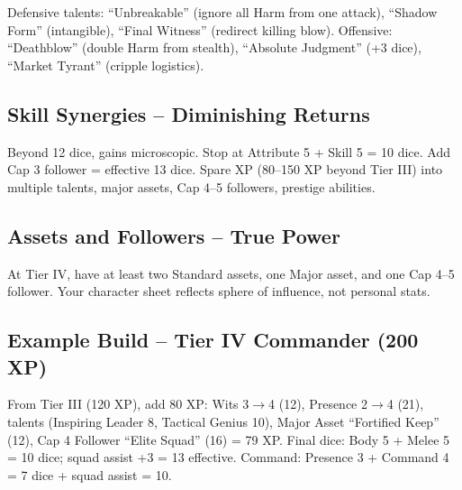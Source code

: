 \documentclass[11pt]{article}
\begin{document}
Defensive talents: ``Unbreakable'' (ignore all Harm from one attack), ``Shadow Form'' (intangible), ``Final Witness'' (redirect killing blow). Offensive: ``Deathblow'' (double Harm from stealth), ``Absolute Judgment'' (+3 dice), ``Market Tyrant'' (cripple logistics).

\subsection{Skill Synergies -- Diminishing Returns}
Beyond 12 dice, gains microscopic. Stop at Attribute 5 + Skill 5 = 10 dice. Add Cap 3 follower = effective 13 dice. Spare XP (80--150 XP beyond Tier III) into multiple talents, major assets, Cap 4--5 followers, prestige abilities.

\subsection{Assets and Followers -- True Power}
At Tier IV, have at least two Standard assets, one Major asset, and one Cap 4--5 follower. Your character sheet reflects sphere of influence, not personal stats.

\subsection{Example Build -- Tier IV Commander (200 XP)}
From Tier III (120 XP), add 80 XP: Wits 3$\rightarrow$4 (12), Presence 2$\rightarrow$4 (21), talents (Inspiring Leader 8, Tactical Genius 10), Major Asset ``Fortified Keep'' (12), Cap 4 Follower ``Elite Squad'' (16) = 79 XP. Final dice: Body 5 + Melee 5 = 10 dice; squad assist +3 = 13 effective. Command: Presence 3 + Command 4 = 7 dice + squad assist = 10.
\end{document}
